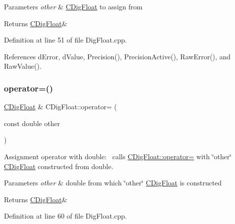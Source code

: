 \begin{DoxyParams}{Parameters}
{\em other} & \hyperlink{classCDigFloat}{C\+Dig\+Float} to assign from \\
\hline
\end{DoxyParams}
\begin{DoxyReturn}{Returns}
\hyperlink{classCDigFloat}{C\+Dig\+Float}\& 
\end{DoxyReturn}


Definition at line 51 of file Dig\+Float.\+cpp.



References d\+Error, d\+Value, Precision(), Precision\+Active(), Raw\+Error(), and Raw\+Value().

\mbox{\label{classCDigFloat_a6113b805767862e3e98fac9a3e10c7cd}} 
\subsubsection{\texorpdfstring{operator=()}{operator=()}\hspace{0.1cm}{\footnotesize\ttfamily [2/2]}}
{\footnotesize\ttfamily \hyperlink{classCDigFloat}{C\+Dig\+Float} \& C\+Dig\+Float\+::operator= (\begin{DoxyParamCaption}\item[{const double}]{other }\end{DoxyParamCaption})}



Assignment operator with double\+:~\newline
 calls \hyperlink{classCDigFloat_a74f36566c2c79d7258b7b2dee35d46b2}{C\+Dig\+Float\+::operator=} with \char`\"{}other\char`\"{} \hyperlink{classCDigFloat}{C\+Dig\+Float} constructed from double. 


\begin{DoxyParams}{Parameters}
{\em other} & double from which \char`\"{}other\char`\"{} \hyperlink{classCDigFloat}{C\+Dig\+Float} is constructed \\
\hline
\end{DoxyParams}
\begin{DoxyReturn}{Returns}
\hyperlink{classCDigFloat}{C\+Dig\+Float}\& 
\end{DoxyReturn}


Definition at line 60 of file Dig\+Float.\+cpp.



